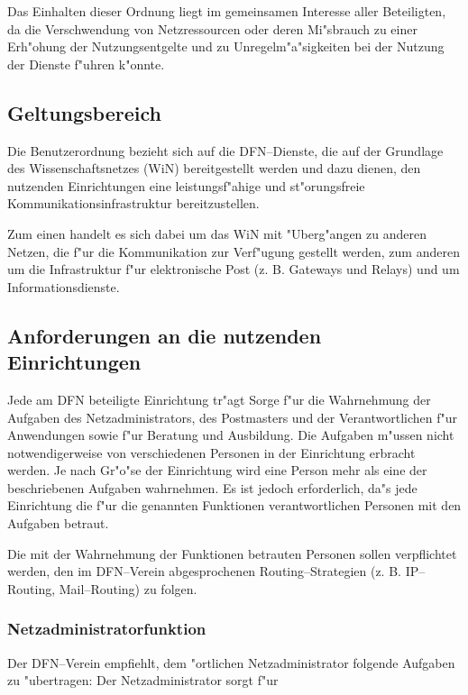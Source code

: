 \documentclass[12pt,titlepage,twoside]{scrartcl}
\begin{document}
\begin{appendix}
Das Einhalten dieser Ordnung liegt im gemeinsamen Interesse aller
Beteiligten, da die Verschwendung von Netzressourcen oder deren Mi"sbrauch zu
einer Erh"ohung der Nutzungsentgelte und zu Unregelm"a"sigkeiten bei der
Nutzung der Dienste f"uhren k"onnte.

\subsection{Geltungsbereich}

Die Benutzerordnung bezieht sich auf die DFN--Dienste, die auf der Grundlage
des Wissenschaftsnetzes (WiN) bereitgestellt werden und dazu dienen, den
nutzenden Einrichtungen eine leistungsf"ahige und st"orungsfreie
Kommunikationsinfrastruktur bereitzustellen.

Zum einen handelt es sich dabei um das WiN mit "Uberg"angen zu anderen Netzen,
die f"ur die Kommunikation zur Verf"ugung gestellt werden, zum anderen um die
Infrastruktur f"ur elektronische Post (z. B. Gateways und Relays) und um
Informationsdienste.

\subsection{Anforderungen an die nutzenden Einrichtungen}

Jede am DFN beteiligte Einrichtung tr"agt Sorge f"ur die Wahrnehmung der
Aufgaben des Netzadministrators, des Postmasters und der Verantwortlichen
f"ur Anwendungen sowie f"ur Beratung und Ausbildung. Die Aufgaben m"ussen nicht
notwendigerweise von verschiedenen Personen in der Einrichtung erbracht
werden. Je nach Gr"o"se der Einrichtung wird eine Person mehr als eine der
beschriebenen Aufgaben wahrnehmen. Es ist jedoch erforderlich, da"s jede
Einrichtung die f"ur die genannten Funktionen verantwortlichen Personen mit
den Aufgaben betraut.

Die mit der Wahrnehmung der Funktionen betrauten Personen sollen
verpflichtet werden, den im DFN--Verein abgesprochenen Routing--Strategien (z.
B. IP--Routing, Mail--Routing) zu folgen.

\subsubsection{Netzadministratorfunktion}

Der DFN--Verein empfiehlt, dem "ortlichen Netzadministrator folgende Aufgaben
zu "ubertragen: Der Netzadministrator sorgt f"ur


\end{appendix}
\end{document}
